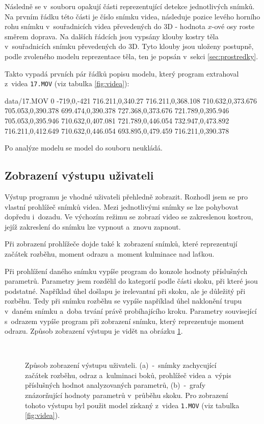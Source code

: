 Následně se v~souboru opakují části reprezentující detekce jednotlivých snímků. Na prvním řádku této části je číslo snímku videa, následuje pozice levého horního rohu snímku v~souřadnicích videa převedených do 3D - hodnota $x$-ové osy roste směrem doprava. Na dalších řádcích jsou vypsány klouby kostry těla v~souřadnicích snímku převedených do 3D. Tyto klouby jsou uloženy postupně, podle zvoleného modelu reprezentace těla, ten je popsán v~sekci \ref{sec:prostredky}.

Takto vypadá prvních pár řádků popisu modelu, který program extrahoval z~videa \texttt{17.MOV} (viz tabulka \ref{fig:videa}):
\begin{code}[fontsize=\footnotesize]
data/17.MOV
0
-719,0,-421
716.211,0,340.27
716.211,0,368.108
710.632,0,373.676
705.053,0,390.378
699.474,0,390.378
727.368,0,373.676
721.789,0,395.946
705.053,0,395.946
710.632,0,407.081
721.789,0,446.054
732.947,0,473.892
716.211,0,412.649
710.632,0,446.054
693.895,0,479.459
716.211,0,390.378
\end{code}

Po analýze modelu se model do souboru neukládá.


\subsection{Zobrazení výstupu uživateli}

Výstup programu je vhodné uživateli přehledně zobrazit. Rozhodl jsem se pro vlastní prohlížeč snímků videa. Mezi jednotlivými snímky se lze pohybovat dopředu i~dozadu. Ve výchozím režimu se zobrazí video se zakreslenou kostrou, jejíž zakreslení do snímku lze vypnout a~znovu zapnout.

Při zobrazení prohlížeče dojde také k~zobrazení snímků, které reprezentují začátek rozběhu, moment odrazu a~moment kulminace nad laťkou.

Při prohlížení daného snímku vypíše program do konzole hodnoty příslušných parametrů. Parametry jsem rozdělil do kategorií podle části skoku, při které jsou podstatné. Například úhel došlapu je irelevantní při skoku, ale je důležitý při rozběhu. Tedy při snímku rozběhu se vypíše například úhel naklonění trupu v~daném snímku a~doba trvání právě probíhajícího kroku. Parametry související s~odrazem vypíše program při zobrazení snímku, který reprezentuje moment odrazu. Způsob zobrazení výstupu je vidět na obrázku \ref{fig:vystup}.

\begin{figure}[p]\centering
     \\
    \caption{
        \centering\small
        Způsob zobrazení výstupu uživateli. (a)~-~snímky zachycující začátek rozběhu, odraz a~kulminaci boků, prohlížeč videa a~výpis příslušných hodnot analyzovaných parametrů, (b)~-~grafy znázorňující hodnoty parametrů v~průběhu skoku. Pro zobrazení tohoto výstupu byl použit model získaný z~videa \texttt{1.MOV} (viz tabulka \ref{fig:videa}).
    }
    \label{fig:vystup}
\end{figure}


